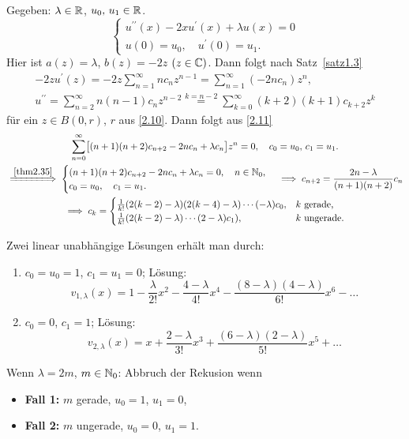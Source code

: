 \documentclass[a4paper,twoside,DIV15,BCOR12mm]{scrbook}
\begin{document}
\begin{bsp}
Gegeben: $\lambda\in\mathbb{R}$, $u_0,\,u_1\in\mathbb{R}$.
\begin{equation}\label{2.11}\begin{cases}
u^{\prime\prime}(x)-2xu^\prime(x)+\lambda u(x)=0\\
u(0)=u_0,\quad u^\prime(0)=u_1.
\end{cases}\end{equation}
Hier ist $a(z)=\lambda$, $b(z)=-2z$ $(z\in\mathbb{C})$. Dann folgt nach Satz~\ref{satz1.3}
\begin{gather*}
-2zu^\prime(z)=-2z\sum_{n=1}^{\infty}nc_nz^{n-1}=\sum_{n=1}^{\infty}(-2nc_n)z^n,\\
u^{\prime\prime}=\sum_{n=2}^{\infty}n(n-1)c_nz^{n-2}\overset{k=n-2}{=}\sum_{k=0}^{\infty}(k+2)(k+1)c_{k+2}z^k
\end{gather*}
für ein $z\in B(0,r)$, $r$ aus \eqref{2.10}. Dann folgt aus \eqref{2.11}
\begin{gather*}
\sum_{n=0}^{\infty}\bigl[(n+1)(n+2)c_{n+2}-2nc_n+\lambda c_n\bigr]z^n=0,\quad c_0=u_0,\,c_1=u_1.\\
\folgtwegen{\ref{thm2.35}}\begin{cases}(n+1)(n+2)c_{n+2}-2nc_n+\lambda c_n=0,\quad n\in\N_0,\\c_0=u_0,\quad c_1=u_1.\end{cases}\folgt c_{n+2}=\frac{2n-\lambda}{(n+1)(n+2)}c_n\\
\folgt c_k = \begin{cases}
\frac{1}{k!}(2(k-2)-\lambda)(2(k-4)-\lambda)\dotsm(-\lambda)c_0,&k\text{ gerade,}\\
\frac{1}{k!}(2(k-2)-\lambda)\dotsm(2-\lambda)c_1),&k\text{ ungerade.}\end{cases}
\end{gather*}

Zwei linear unabhängige Lösungen erhält man durch:

\begin{enumerate}[label=\arabic*)]
\item $c_0=u_0=1$, $c_1=u_1=0$; Lösung:
\[v_{1,\lambda}(x)=1-\frac{\lambda}{2!}x^2-\frac{4-\lambda}{4!}x^4-\frac{(8-\lambda)(4-\lambda)}{6!}x^6-\dotso\]
\item $c_0=0$, $c_1=1$; Lösung:
\[v_{2,\lambda}(x)=x+\frac{2-\lambda}{3!}x^3+\frac{(6-\lambda)(2-\lambda)}{5!}x^5+\dotso\]
\end{enumerate}

Wenn $\lambda=2m$, $m\in\mathbb{N}_0$: Abbruch der Rekusion wenn
\begin{itemize}
\item[] \textbf{Fall 1:} $m$ gerade, $u_0=1$, $u_1=0$,
\item[] \textbf{Fall 2:} $m$ ungerade, $u_0=0$, $u_1=1$.
\end{itemize}


\end{bsp}
\end{document}
